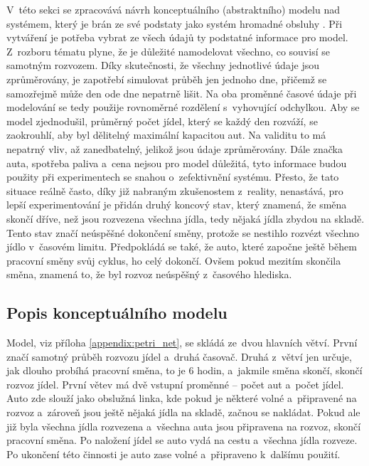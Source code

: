 \documentclass[a4paper, 11pt]{article}
\begin{document}
	V~této sekci se zpracovává návrh konceptuálního (abstraktního) modelu
	\cite[snímek 48]{IMS_slides} nad systémem, který je brán ze své podstaty
	jako systém hromadné obsluhy \cite[snímek 136]{IMS_slides}. Při vytváření
	je potřeba vybrat ze všech údajů ty podstatné informace pro model.
	Z~rozboru tématu plyne, že je důležité namodelovat všechno, co souvisí se
	samotným rozvozem. Díky skutečnosti, že všechny jednotlivé údaje jsou
	zprůměrovány, je zapotřebí simulovat průběh jen jednoho dne, přičemž se
	samozřejmě může den ode dne nepatrně lišit.	Na oba proměnné časové údaje
	při modelování se tedy použije rovnoměrné rozdělení
	\cite[snímek 89]{IMS_slides} s~vyhovující odchylkou. Aby se model
	zjednodušil, průměrný počet jídel, který se každý den rozváží, se
	zaokrouhlí, aby byl dělitelný maximální kapacitou aut. Na validitu to má
	nepatrný vliv, až zanedbatelný, jelikož jsou údaje zprůměrovány. Dále
	značka auta, spotřeba paliva a~cena nejsou pro model důležitá, tyto
	informace budou použity při experimentech se snahou o~zefektivnění systému.
	Přesto, že tato situace reálně často, díky již nabraným zkušenostem
	z~reality, nenastává, pro lepší experimentování je přidán druhý koncový
	stav, který znamená, že směna skončí dříve, než jsou rozvezena všechna
	jídla, tedy nějaká jídla zbydou na skladě. Tento stav značí neúspěšné
	dokončení směny, protože se nestihlo rozvézt všechno jídlo v~časovém
	limitu. Předpokládá se také, že auto, které započne ještě během pracovní
	směny svůj cyklus, ho celý dokončí. Ovšem pokud mezitím skončila směna,
	znamená to, že byl rozvoz neúspěšný z~časového hlediska.


	\subsection{Popis konceptuálního modelu}
	\label{section:conceptual_model_desc}

	Model, viz příloha \ref{appendix:petri_net}, se skládá ze~dvou hlavních
	větví. První značí samotný průběh rozvozu jídel a~druhá časovač. Druhá
	z~větví jen určuje, jak dlouho probíhá pracovní směna, to je 6 hodin,
	a~jakmile směna skončí, skončí rozvoz jídel. První větev má dvě vstupní
	proměnné -- počet aut a~počet jídel. Auto zde slouží jako obslužná linka,
	kde pokud je některé volné a~připravené na rozvoz a~zároveň jsou ještě
	nějaká jídla na skladě, začnou se nakládat. Pokud ale již byla všechna
	jídla rozvezena a~všechna auta jsou připravena na rozvoz, skončí pracovní
	směna. Po naložení jídel se auto vydá na cestu a~všechna jídla rozveze.
	Po ukončení této činnosti je auto zase volné a~připraveno k~dalšímu použití.
\end{document}
